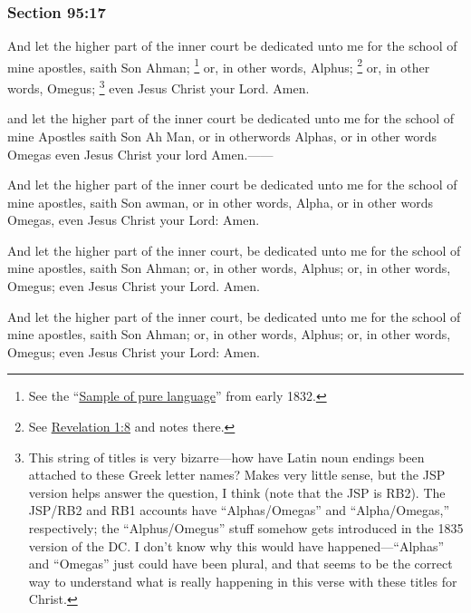 	\subsubsection{Section 95:17} %
		\label{DC95-17}

		And let the higher part of the inner court be dedicated unto me for the school of mine apostles, saith Son Ahman;%
			\footnote{%
				See the ``\hyperref[EMS-1832-JS-CIR-4-MAR-1832-LANG]{Sample of pure language}'' from early 1832. 
				}
		or, in other words, Alphus;%
			\footnote{%
				See \hyperref[REVELATIONNT-1-8]{Revelation 1:8} and notes there.
				}
		or, in other words, Omegus;%
			\footnote{%
				This string of titles is very bizarre---how have Latin noun endings been attached to these Greek letter names? Makes very little sense, but the JSP version helps answer the question, I think (note that the JSP is RB2). The JSP/RB2 and RB1 accounts have ``Alphas/Omegas'' and ``Alpha/Omegas,'' respectively; the ``Alphus/Omegus'' stuff somehow gets introduced in the 1835 version of the DC. I don't know why this would have happened---``Alphas'' and ``Omegas'' just could have been plural, and that seems to be the correct way to understand what is really happening in this verse with these titles for Christ.
				}
		even Jesus Christ your Lord. Amen.

		\begin{framed}
		\scriptsize
			\begin{compactdesc}
				\item[JSP] and let the higher part of the inner court be dedicated unto me for the school of mine Apostles saith Son Ah Man, or in otherwords Alphas, or in other words Omegas even Jesus Christ your lord Amen.------
				\item[RB1] And let the higher part of the inner court be dedicated unto me for the school of mine apostles, saith Son awman, or in other words, Alpha, or in other words Omegas, even Jesus Christ your Lord: Amen.
				\item[DC 1835] And let the higher part of the inner court, be dedicated unto me for the school of mine apostles, saith Son Ahman; or, in other words, Alphus; or, in other words, Omegus; even Jesus Christ your Lord. Amen.
				\item[DC 1844] And let the higher part of the inner court, be dedicated unto me for the school of mine apostles, saith Son Ahman; or, in other words, Alphus; or, in other words, Omegus; even Jesus Christ your Lord: Amen.
			\end{compactdesc}
		\end{framed}